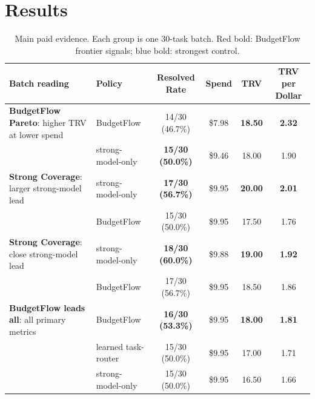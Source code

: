 \documentclass[letterpaper]{article}
\newcommand{\method}{BudgetFlow\xspace}
\newcommand{\trv}{TRV\xspace}
\newcommand{\pos}[1]{\textcolor{bfcoral}{\textbf{#1}}}
\newcommand{\ctrl}[1]{\textcolor{bfblue}{\textbf{#1}}}
\begin{document}
\section{Results}
\label{sec:results}

\begin{table}[!t]
\centering
\normalsize
\renewcommand{\arraystretch}{1.18}
\setlength{\tabcolsep}{5pt}
\begin{tabular}{@{}>{\raggedright\arraybackslash}p{}lcccc@{}}
\toprule
Batch reading & Policy & Resolved Rate & Spend & TRV & TRV per Dollar \\
\midrule
\textbf{BudgetFlow Pareto}: higher \trv at lower spend & \method & 14/30 (46.7\%) & \$7.98 & \pos{18.50} & \pos{2.32} \\
 & strong-model-only & \ctrl{15/30 (50.0\%)} & \$9.46 & 18.00 & 1.90 \\
\addlinespace
\textbf{Strong Coverage}: larger strong-model lead & strong-model-only & \ctrl{17/30 (56.7\%)} & \$9.95 & \ctrl{20.00} & \ctrl{2.01} \\
 & \method & 15/30 (50.0\%) & \$9.95 & 17.50 & 1.76 \\
\addlinespace
\textbf{Strong Coverage}: close strong-model lead & strong-model-only & \ctrl{18/30 (60.0\%)} & \$9.88 & \ctrl{19.00} & \ctrl{1.92} \\
 & \method & 17/30 (56.7\%) & \$9.95 & 18.50 & 1.86 \\
\addlinespace
\textbf{BudgetFlow leads all}: all primary metrics & \method & \pos{16/30 (53.3\%)} & \$9.95 & \pos{18.00} & \pos{1.81} \\
 & learned task-router & 15/30 (50.0\%) & \$9.95 & 17.00 & 1.71 \\
 & strong-model-only & 15/30 (50.0\%) & \$9.95 & 16.50 & 1.66 \\
\bottomrule
\end{tabular}
\caption{Main paid evidence. Each group is one 30-task batch. Red bold: \method frontier signals; blue bold: strongest control.}
\label{tab:main-evidence}
\end{table}
\end{document}
